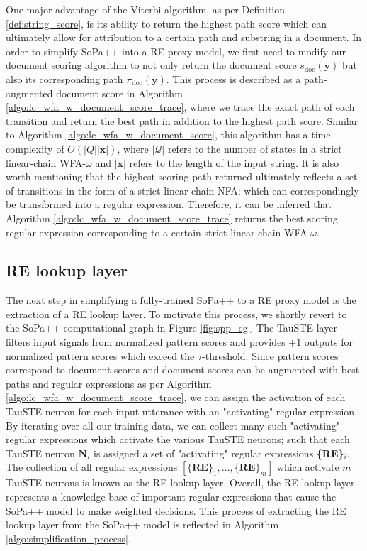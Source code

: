 One major advantage of the Viterbi algorithm, as per Definition
\ref{def:string_score}, is its ability to return the highest path score which
can ultimately allow for attribution to a certain path and substring in a
document. In order to simplify SoPa++ into a RE proxy model, we first need to
modify our document scoring algorithm to not only return the document score
$s_{\text{doc}}(\bm{y})$ but also its corresponding path
$\pi_{\text{doc}}(\bm{y})$. This process is described as a path-augmented
document score in Algorithm \ref{algo:lc_wfa_w_document_score_trace}, where we
trace the exact path of each transition and return the best path in addition to
the highest path score. Similar to Algorithm \ref{algo:lc_wfa_w_document_score},
this algorithm has a time-complexity of $O(|Q||\bm{x}|)$, where
$|\mathcal{Q}|$ refers to the number of states in a strict linear-chain
WFA-$\omega$ and $|\bm{x}|$ refers to the length of the input string. It is also
worth mentioning that the highest scoring path returned ultimately reflects a set of
transitions in the form of a strict linear-chain NFA; which can correspondingly
be transformed into a regular expression. Therefore, it can be inferred that
Algorithm \ref{algo:lc_wfa_w_document_score_trace} returns the best scoring
regular expression corresponding to a certain strict linear-chain WFA-$\omega$.

\subsection{RE lookup layer}

The next step in simplifying a fully-trained SoPa++ to a RE proxy model is the
extraction of a RE lookup layer. To motivate this process, we shortly revert to
the SoPa++ computational graph in Figure \ref{fig:spp_cg}. The TauSTE layer
filters input signals from normalized pattern scores and provides +1 outputs for
normalized pattern scores which exceed the $\tau$-threshold. Since pattern
scores correspond to document scores and document scores can be augmented with
best paths and regular expressions as per Algorithm
\ref{algo:lc_wfa_w_document_score_trace}, we can assign the activation of each
TauSTE neuron for each input utterance with an "activating" regular expression.
By iterating over all our training data, we can collect many such "activating"
regular expressions which activate the various TauSTE neurons; such that each
TauSTE neuron $\textbf{N}_i$ is assigned a set of "activating" regular expressions
\textbf{\{RE\}$_i$}. The collection of all regular expressions
$[\{\textbf{RE}\}_1, \ldots, \{\textbf{RE}\}_m]$ which activate $m$ TauSTE
neurons is known as the RE lookup layer. Overall, the RE lookup layer represents
a knowledge base of important regular expressions that cause the SoPa++ model to
make weighted decisions. This process of extracting the RE lookup layer from
the SoPa++ model is reflected in Algorithm \ref{algo:simplification_process}.

